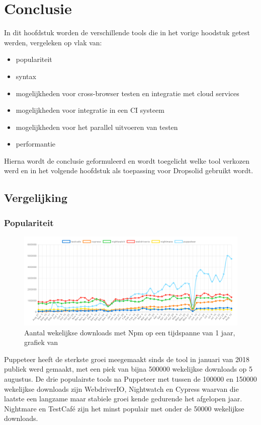 
\chapter{Conclusie}
\label{ch:conclusie}
In dit hoofdstuk worden de verschillende \glspl{tool} die in het vorige hoodstuk getest werden, vergeleken op vlak van:
\begin{itemize}
\item populariteit
\item syntax
\item mogelijkheden voor cross-browser testen en integratie met cloud services
\item mogelijkheden voor integratie in een \gls{CI} systeem
\item mogelijkheden voor het parallel uitvoeren van testen
\item performantie
\end{itemize}
Hierna wordt de conclusie geformuleerd en wordt toegelicht welke \gls{tool} verkozen werd en in het volgende hoofdstuk als toepassing voor Dropsolid gebruikt wordt.

\clearpage
\section{Vergelijking}
\subsection{Populariteit}
\begin{figure}[h]
\caption{Aantal wekelijkse downloads met Npm op een tijdspanne van 1 jaar, grafiek van \textcite{npmtrends}}
\includegraphics[width=1\textwidth]{img/npm_trends.PNG}
\end{figure}
Puppeteer heeft de sterkste groei meegemaakt sinds de \gls{tool} in januari van 2018 publiek werd gemaakt, met een piek van bijna 500000 wekelijkse downloads op 5 augustus. De drie populairste \glspl{tool} na Puppeteer met tussen de 100000 en 150000 wekelijkse downloads zijn WebdriverIO, Nightwatch en Cypress waarvan die laatste een langzame maar stabiele groei kende gedurende het afgelopen jaar. Nightmare en TestCafé zijn het minst populair met onder de 50000 wekelijkse downloads.

